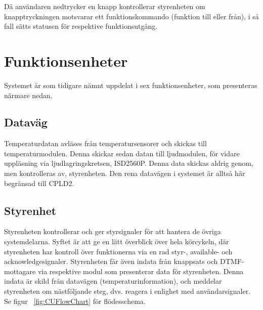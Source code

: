 \documentclass[a4paper,11pt]{article}
\begin{document}
Då användaren nedtrycker en knapp kontrollerar styrenheten om knapptryckningen motsvarar ett funktionskommando (funktion till eller från), i så fall sätts statusen för respektive funktionsutgång.

\section{Funktionsenheter}
\label{sec:Funktionsenheter}
Systemet är som tidigare nämnt uppdelat i sex funktionsenheter, som presenteras närmare nedan.

	\subsection{Dataväg}
	Temperaturdatan avläses från temperatursensorer och skickas till temperaturmodulen. Denna skickar sedan datan till ljudmodulen, för vidare uppläsning via ljudlagringskretsen, ISD2560P. Denna data skickas aldrig genom, men kontrolleras av, styrenheten. Den rena datavägen i systemet är alltså här begränsad till CPLD2.
	
	\subsection{Styrenhet}

	Styrenheten kontrollerar och ger styrsignaler för att hantera de övriga systemdelarna. Syftet är att ge en lätt överblick över hela körcykeln, där styrenheten har kontroll över funktionerna via en rad styr-, available- och acknowledgesignaler. Styrenheten får även indata från knappsats och DTMF-mottagare via respektive modul som presenterar data för styrenheten. Denna indata är skild från datavägen (temperaturinformation), och meddelar styrenheten om nästföljande steg, dvs. reagera i enlighet med användarsignaler. Se figur ~\ref{fig:CUFlowChart} för flödesschema.
\end{document}

